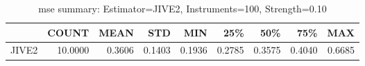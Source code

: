 \begin{table}[ht]
\centering
\caption{mse summary: Estimator=JIVE2, Instruments=100, Strength=0.10}
\begin{tabular}{lrrrrrrrr}
\toprule
 & COUNT & MEAN & STD & MIN & 25\% & 50\% & 75\% & MAX \\
\midrule
JIVE2 & 10.0000 & 0.3606 & 0.1403 & 0.1936 & 0.2785 & 0.3575 & 0.4040 & 0.6685 \\
\bottomrule
\end{tabular}
\end{table}
